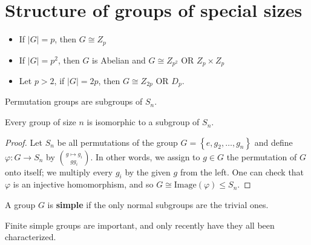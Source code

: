 \documentclass{memoir}
\begin{document}
\section{Structure of groups of special sizes}
\label{sec:structure_of_groups_of_special_sizes}
\begin{prop}
	\begin{itemize}
		\item If \(\left| G \right| = p\), then \(G \cong Z_p\)
		\item If \(\left| G \right| =p^2\), then \(G\) is Abelian and \(G \cong Z_{p^2} \text{ OR }Z_p \times Z_p\)
		\item Let \(p>2\), if \(\left| G \right| = 2p\), then \(G \cong Z_{2p} \text{ OR } D_p\).
	\end{itemize}
\end{prop}
\begin{defn}
	Permutation groups are subgroups of \(S_n\).
\end{defn}
\begin{thm}
	Every group of size \(n\) is isomorphic to a subgroup of \(S_n\).
\end{thm}
\begin{proof}
	Let \(S_n\) be all permutations of the group \(G = \left\{ e,g_2,\ldots,g_n \right\} \) and define \(\varphi:G\to S_n\) by \(g \mapsto {g_i}\choose{gg_i}\). In other words, we assign to \(g\in G\) the permutation of \(G\) onto itself; we multiply every \(g_i\) by the given \(g\) from the left. One can check that \(\varphi\) is an injective homomorphism, and so \(G \cong \textrm{Image}(\varphi)\leq S_n\).
\end{proof}
\begin{defn}[Simple]
	A group \(G\) is \textbf{simple} if the only normal subgroups are the trivial ones.
\end{defn}
Finite simple groups are important, and only recently have they all been characterized.
\end{document}
